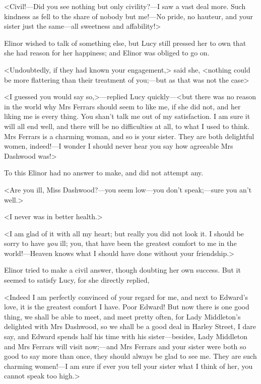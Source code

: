 <Civil!—Did you see nothing but only civility?—I saw a vast deal more. Such kindness as fell to the share of nobody but me!—No pride, no hauteur, and your sister just the same—all sweetness and affability!>

Elinor wished to talk of something else, but Lucy still pressed her to own that she had reason for her happiness; and Elinor was obliged to go on.

<Undoubtedly, if they had known your engagement,> said she, <nothing could be more flattering than their treatment of you;—but as that was not the case\longdash>

<I guessed you would say so,>—replied Lucy quickly—<but there was no reason in the world why Mrs Ferrars should seem to like me, if she did not, and her liking me is every thing. You shan't talk me out of my satisfaction. I am sure it will all end well, and there will be no difficulties at all, to what I used to think. Mrs Ferrars is a charming woman, and so is your sister. They are both delightful women, indeed!—I wonder I should never hear you say how agreeable Mrs Dashwood was!>

To this Elinor had no answer to make, and did not attempt any.

<Are you ill, Miss Dashwood?—you seem low—you don't speak;—sure you an't well.>

<I never was in better health.>

<I am glad of it with all my heart; but really you did not look it. I should be sorry to have \textit{you} ill; you, that have been the greatest comfort to me in the world!—Heaven knows what I should have done without your friendship.>

Elinor tried to make a civil answer, though doubting her own success. But it seemed to satisfy Lucy, for she directly replied,

<Indeed I am perfectly convinced of your regard for me, and next to Edward's love, it is the greatest comfort I have. Poor Edward! But now there is one good thing, we shall be able to meet, and meet pretty often, for Lady Middleton's delighted with Mrs Dashwood, so we shall be a good deal in Harley Street, I dare say, and Edward spends half his time with his sister—besides, Lady Middleton and Mrs Ferrars will visit now;—and Mrs Ferrars and your sister were both so good to say more than once, they should always be glad to see me. They are such charming women!—I am sure if ever you tell your sister what I think of her, you cannot speak too high.>

